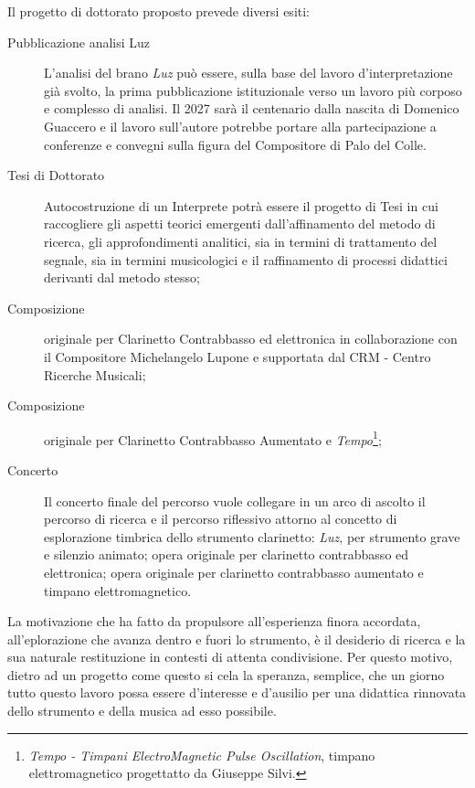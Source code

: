 \documentclass{gs-adonis}
\begin{document}

Il progetto di dottorato proposto prevede diversi esiti:

\begin{description}
  \item[Pubblicazione analisi Luz] L'analisi del brano \emph{Luz} può essere,
    sulla base del lavoro d'interpretazione già svolto, la prima pubblicazione
    istituzionale verso un lavoro più corposo e complesso di analisi. Il 2027
    sarà il centenario dalla nascita di Domenico Guaccero e il lavoro
    sull'autore potrebbe portare alla partecipazione a conferenze e convegni
    sulla figura del Compositore di Palo del Colle.
  \item[Tesi di Dottorato] Autocostruzione di un Interprete potrà essere il
    progetto di Tesi in cui raccogliere gli aspetti teorici emergenti
    dall'affinamento del metodo di ricerca, gli approfondimenti analitici, sia
    in termini di trattamento del segnale, sia in termini musicologici e il
    raffinamento di processi didattici derivanti dal metodo stesso;
  \item[Composizione] originale per Clarinetto Contrabbasso ed elettronica in
    collaborazione con il Compositore Michelangelo Lupone e supportata dal
    CRM - Centro Ricerche Musicali;
  \item[Composizione] originale per Clarinetto Contrabbasso Aumentato e
    \emph{Tempo}\footnote{%
  \emph{Tempo - Timpani ElectroMagnetic Pulse Oscillation}, timpano
  elettromagnetico progettatto da Giuseppe Silvi.
  };
  \item[Concerto] Il concerto finale del percorso vuole collegare in un arco di
    ascolto il percorso di ricerca e il percorso riflessivo attorno al concetto di
    esplorazione timbrica dello strumento clarinetto: \emph{Luz}, per strumento
    grave e silenzio animato; opera originale per clarinetto contrabbasso ed
    elettronica; opera originale per clarinetto contrabbasso aumentato e timpano
    elettromagnetico.
\end{description}


La motivazione che ha fatto da propulsore all'esperienza finora accordata,
all'eplorazione che avanza dentro e fuori lo strumento, è il desiderio di
ricerca e la sua naturale restituzione in contesti di attenta condivisione. Per
questo motivo, dietro ad un progetto come questo si cela la speranza, semplice,
che un giorno tutto questo lavoro possa essere d'interesse e d'ausilio per una
didattica rinnovata dello strumento e della musica ad esso possibile.
\end{document}

